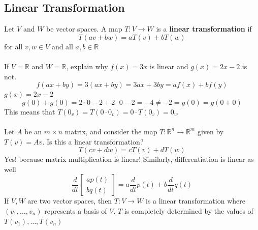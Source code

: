 \begin{enumerate}
\section{Linear Transformation}
Let $V$ and $W$ be vector spaces. A map $T : V \rightarrow W$ is 
a \textbf{linear transformation} if 
\[
  T(av + bw) = aT(v) + bT(w)
\]
for all $v, w \in V$ and all $a, b \in \mathbb{R}$ \\\\
If $V = \mathbb{R}$ and $W = \mathbb{R}$, explain why $f(x) = 3x$ is linear and 
$g(x) = 2x - 2$ is not. 
\[
  f(ax + by) = 3(ax + by) = 3ax + 3by = af(x) + bf(y)
\]
$g(x) = 2x - 2$ 
\[
  g(0) + g(0) = 2 \cdot 0 - 2 + 2 \cdot 0 - 2 = -4 \neq -2 = g(0) = g(0 + 0)
\]
This means that $T(0_v) = T(0 \cdot 0_v) = 0 \cdot T(0_v) = 0_w$ \\\\
Let $A$ be an $m \times n$ matrix, and consider the map $T : \mathbb{R}^n \rightarrow 
\mathbb{R}^m$ given by $T(v) = Av$. Is this a linear transformation? 
\[
  T(cv + dw) = cT(v) + dT(w)
\] Yes! because matrix multiplication is linear! 
Similarly, differentiation is linear as well 
\[
  \frac{d}{dt}\begin{bmatrix}ap(t) \\ bq(t)\end{bmatrix}
  = a\frac{d}{dt}p(t) + b\frac{d}{dt}q(t)
\]
If $V, W$ are two vector spaces, then $T : V \rightarrow W$ is a 
linear transformation where $(v_1, \dots, v_n)$ represents a basis of $V$. 
$T$ is completely determined by the values of $T(v_1), \dots, T(v_n)$

\end{enumerate}
